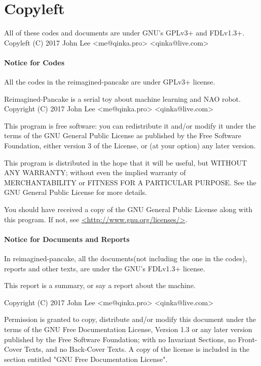 \documentclass[twoside]{article}
\begin{document}
\section*{Copyleft}
\label{sec:copyleft}

All of these codes and documents are under GNU's GPLv3+ and FDLv1.3+. \\
{\large Copyleft (C) 2017 John Lee <me@qinka.pro> <qinka@live.com>} \\

\paragraph{Notice for Codes}

All the codes in the reimagined-pancake are under GPLv3+ license.

Reimagined-Pancake is a serial toy about machine learning and NAO robot.
Copyright (C) 2017 John Lee <me@qinka.pro> <qinka@live.com>

This program is free software: you can redistribute it and/or modify
it under the terms of the GNU General Public License as published by
the Free Software Foundation, either version 3 of the License, or
(at your option) any later version.

This program is distributed in the hope that it will be useful,
but WITHOUT ANY WARRANTY; without even the implied warranty of
MERCHANTABILITY or FITNESS FOR A PARTICULAR PURPOSE.  See the
GNU General Public License for more details.

You should have received a copy of the GNU General Public License
along with this program.  If not, see \href{http://www.gnu.org/licenses}{<http://www.gnu.org/licenses/>}.

\paragraph{Notice for Documents and Reports}

In reimagined-pancake, all the documents(not including the one in the codes), reports and other texts,
are under the GNU's FDLv1.3+ license.

This report is a summary, or say a report about the machine.

Copyright (C)  2017 John Lee <me@qinka.pro> <qinka@live.com>

Permission is granted to copy, distribute and/or modify this document
under the terms of the GNU Free Documentation License, Version 1.3
or any later version published by the Free Software Foundation;
with no Invariant Sections, no Front-Cover Texts, and no Back-Cover Texts.
A copy of the license is included in the section entitled "GNU
Free Documentation License".
\end{document}
